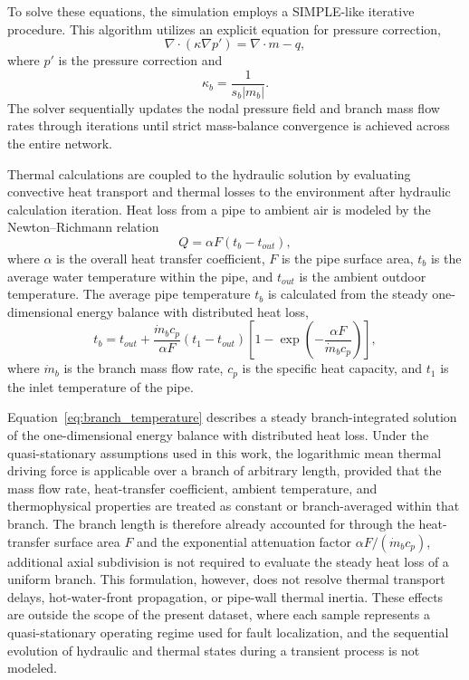 \documentclass[energies,article,submit,pdftex,moreauthors]{Definitions/mdpi}
\begin{document}
To solve these equations, the simulation employs a SIMPLE-like iterative
procedure. This algorithm utilizes an explicit equation for pressure
correction,
\begin{equation}
	\nabla \cdot (\kappa \nabla p') = \nabla \cdot m - q,
\end{equation}
where $p'$ is the pressure correction and
\begin{equation}
	\kappa_b = \frac{1}{s_b |m_b|}.
\end{equation}
The solver sequentially updates the nodal pressure field and branch mass flow rates through
iterations until strict mass-balance convergence is achieved across the entire network.

Thermal calculations are coupled to the hydraulic solution by evaluating
convective heat transport and thermal losses to the environment after hydraulic
calculation iteration. Heat loss from a pipe to ambient air is modeled by the
Newton--Richmann relation
\begin{equation}
	Q = \alpha F (t_b - t_{out}),
\end{equation}
where $\alpha$ is the overall heat transfer coefficient, $F$ is the pipe surface area, $t_b$
is the average water temperature within the pipe, and $t_{out}$ is the ambient outdoor
temperature. The average pipe temperature $t_b$ is calculated from the steady one-dimensional
energy balance with distributed heat loss,
\begin{equation}
	\label{eq:branch_temperature}
	t_b = t_{out} +
	\frac{\dot{m}_b c_p}{\alpha F}
	(t_1 - t_{out})
	\left[
		1 - \exp\left(
		-\frac{\alpha F}{\dot{m}_b c_p}
		\right)
		\right],
\end{equation}
where $\dot{m}_b$ is the branch mass flow rate, $c_p$ is the specific heat capacity, and
$t_1$ is the inlet temperature of the pipe.

Equation~\eqref{eq:branch_temperature} describes a steady branch-integrated
solution of the one-dimensional energy balance with distributed heat loss.
Under the quasi-stationary assumptions used in this work, the logarithmic mean
thermal driving force is applicable over a branch of arbitrary length, provided
that the mass flow rate, heat-transfer coefficient, ambient temperature, and
thermophysical properties are treated as constant or branch-averaged within
that branch. The branch length is therefore already accounted for through the
heat-transfer surface area $F$ and the exponential attenuation factor $\alpha
	F/(\dot{m}_b c_p)$, additional axial subdivision is not required to evaluate
the steady heat loss of a uniform branch. This formulation, however, does not
resolve thermal transport delays, hot-water-front propagation, or pipe-wall
thermal inertia. These effects are outside the scope of the present dataset,
where each sample represents a quasi-stationary operating regime used for fault
localization, and the sequential evolution of hydraulic and thermal states
during a transient process is not modeled.
\end{document}
